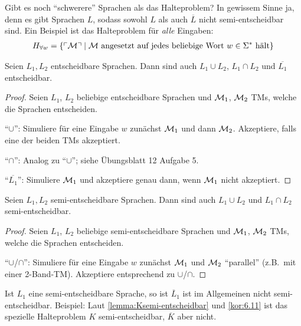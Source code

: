 \begin{Bemerkung}
	Gibt es noch "`schwerere"' Sprachen als das Halteproblem?
	In gewissem Sinne ja, denn es gibt Sprachen $L$, sodass sowohl $L$ als auch $\overline{L}$ nicht semi-entscheidbar sind.
	Ein Beispiel ist das Halteproblem für \emph{alle} Eingaben:
	\begin{align*}
		H_{\forall w} = \{\ulcorner \mathcal{M} \urcorner \mid \text{$\mathcal{M}$ angesetzt auf jedes beliebige Wort $w \in \Sigma^*$ hält}\}
		\qedhere
	\end{align*}
\end{Bemerkung}

\begin{Satz}
	Seien $L_1, L_2$ entscheidbare Sprachen.
	Dann sind auch $L_1 \cup L_2$, $L_1 \cap L_2$ und $\overline{L_1}$ entscheidbar.
\end{Satz}

\begin{proof}
	Seien $L_1$, $L_2$ beliebige entscheidbare Sprachen und $\mathcal{M}_1$, $\mathcal{M}_2$ \ac{TM}s, welche die Sprachen entscheiden.

	"`$\cup$"': Simuliere für eine Eingabe $w$ zunächst $\mathcal{M}_1$ und dann $\mathcal{M}_2$.
	Akzeptiere, falls eine der beiden \ac{TM}s akzeptiert.

	"`$\cap$"': Analog zu "`$\cup$"'; siehe Übungsblatt 12 Aufgabe 5.

	"`$\overline{L_1}$"': Simuliere $\mathcal{M}_1$ und akzeptiere genau dann, wenn $\mathcal{M}_1$ nicht akzeptiert.
\end{proof}

\begin{Satz}
	Seien $L_1, L_2$ semi-entscheidbare Sprachen.
	Dann sind auch $L_1 \cup L_2$ und $L_1 \cap L_2$ semi-entscheidbar.
\end{Satz}

\begin{proof}
	Seien $L_1$, $L_2$ beliebige semi-entscheidbare Sprachen und $\mathcal{M}_1$, $\mathcal{M}_2$ \ac{TM}s, welche die Sprachen entscheiden.

	"`$\cup$/$\cap$"': Simuliere für eine Eingabe $w$ zunächst $\mathcal{M}_1$ und $\mathcal{M}_2$ "`parallel"' (z.B.\ mit einer 2-Band-\ac{TM}).
	Akzeptiere entsprechend zu $\cup$/$\cap$.
\end{proof}

\begin{Bemerkung}
	Ist $L_1$ eine semi-entscheidbare Sprache, so ist $\overline{L}_1$ ist im Allgemeinen nicht semi-entscheidbar.
	Beispiel: Laut \autoref{lemma:Ksemi-entscheidbar} und \autoref{kor:6.11} ist das spezielle Halteproblem $K$ semi-entscheidbar, $\overline{K}$ aber nicht.
\end{Bemerkung}


